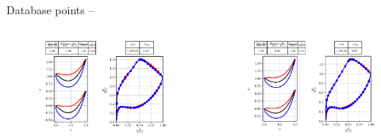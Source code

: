 \newcommand\scaleVal{0.45}

\begin{frame}{Database points -- }

    \begin{columns}
        \begin{figure}
            \centering
            \includegraphics[scale=\scaleVal]{./images/bladeVal0305.eps}
        \end{figure}
        \begin{figure}
            \centering
            \includegraphics[scale=\scaleVal]{./images/bladeVal1336.eps}
        \end{figure}
    \end{columns}
\end{frame}

